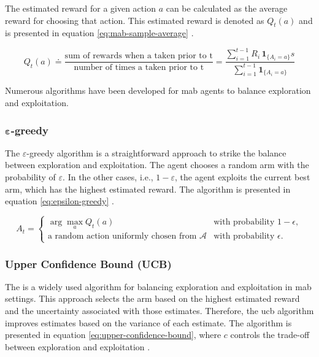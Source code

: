 The estimated reward for a given action $a$ can be calculated as the average reward for choosing that action.
This estimated reward is denoted as $Q_t(a)$ and is presented in equation \ref{eq:mab-sample-average} \cite{sutton_reinforcement_2018}.

\begin{equation}\label{eq:mab-sample-average}
    Q_t(a) \doteq \frac{\text{sum of rewards when a taken prior to t}}{\text{number of times a taken prior to t}} = \frac{\sum_{i=1}^{t-1} R_i \, \mathbf{1}_{\{A_i = a\}}s}{\sum_{i=1}^{t-1} \mathbf{1}_{\{A_i = a\}}}
\end{equation}

Numerous algorithms have been developed for \gls{mab} agents to balance exploration and exploitation.

\subsubsection{$\mathbf{\varepsilon}$-greedy}
The $\varepsilon$-greedy algorithm is a straightforward approach to strike the balance between exploration and exploitation.
The agent chooses a random arm with the probability of $\varepsilon$.
In the other cases, i.e., $1-\varepsilon$, the agent exploits the current best arm, which has the highest estimated reward.
The algorithm is presented in equation \ref{eq:epsilon-greedy} \cite{sutton_reinforcement_2018}.

\begin{equation}\label{eq:epsilon-greedy}
A_t =
\begin{cases}
\arg\max_{a} Q_t(a) & \text{with probability } 1-\epsilon, \\
\text{a random action uniformly chosen from } \mathcal{A} & \text{with probability } \epsilon.
\end{cases}
\end{equation}

\subsubsection{Upper Confidence Bound (UCB)}
The  is a widely used algorithm for balancing exploration and exploitation in \gls{mab} settings.
This approach selects the arm based on the highest estimated reward and the uncertainty associated with those estimates.
Therefore, the \gls{ucb} algorithm improves estimates based on the variance of each estimate.
The algorithm is presented in equation \ref{eq:upper-confidence-bound}, where $c$ controls the trade-off between exploration and exploitation \cite{sutton_reinforcement_2018}.


